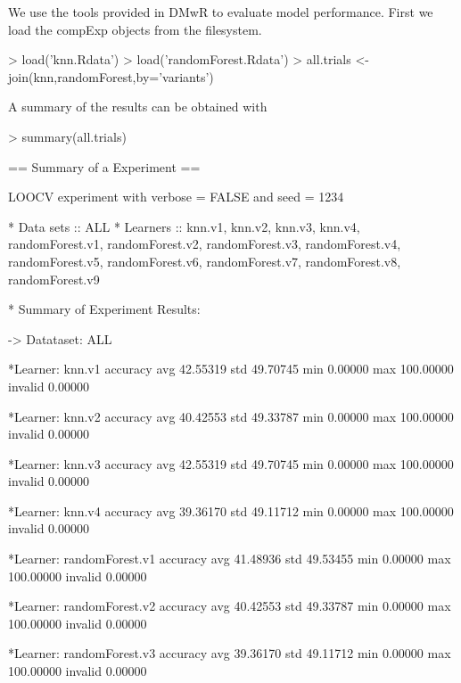 \documentclass{article}
\begin{document}
We use the tools provided in DMwR to evaluate model performance. First we load the compExp objects from the filesystem. 

\begin{Schunk}
\begin{Sinput}
> load('knn.Rdata')
> load('randomForest.Rdata')
> all.trials <- join(knn,randomForest,by='variants')
\end{Sinput}
\end{Schunk}

A summary of the results can be obtained with

\begin{Schunk}
\begin{Sinput}
> summary(all.trials)
\end{Sinput}
\begin{Soutput}
== Summary of a   Experiment ==

 LOOCV experiment with verbose =  FALSE  and seed = 1234 

* Data sets ::  ALL
* Learners  ::  knn.v1, knn.v2, knn.v3, knn.v4, randomForest.v1, randomForest.v2, randomForest.v3, randomForest.v4, randomForest.v5, randomForest.v6, randomForest.v7, randomForest.v8, randomForest.v9

* Summary of Experiment Results:


-> Datataset:  ALL 

	*Learner: knn.v1 
         accuracy
avg      42.55319
std      49.70745
min       0.00000
max     100.00000
invalid   0.00000

	*Learner: knn.v2 
         accuracy
avg      40.42553
std      49.33787
min       0.00000
max     100.00000
invalid   0.00000

	*Learner: knn.v3 
         accuracy
avg      42.55319
std      49.70745
min       0.00000
max     100.00000
invalid   0.00000

	*Learner: knn.v4 
         accuracy
avg      39.36170
std      49.11712
min       0.00000
max     100.00000
invalid   0.00000

	*Learner: randomForest.v1 
         accuracy
avg      41.48936
std      49.53455
min       0.00000
max     100.00000
invalid   0.00000

	*Learner: randomForest.v2 
         accuracy
avg      40.42553
std      49.33787
min       0.00000
max     100.00000
invalid   0.00000

	*Learner: randomForest.v3 
         accuracy
avg      39.36170
std      49.11712
min       0.00000
max     100.00000
invalid   0.00000


\end{Soutput}
\end{Schunk}
\end{document}
